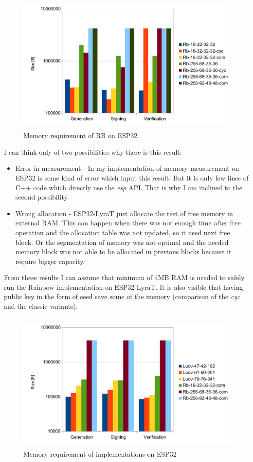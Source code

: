 \documentclass[thesis=M,english]{FITthesis}[2019/12/23]
\begin{document}
\begin{figure}[H]
\centering
\includegraphics[width=13cm,height=7cm]{images/mem-rb.pdf}
\caption{Memory requirement of RB on ESP32}
\label{mem-rb}
\end{figure}

\noindent
I can think only of two possibilities why there is this result:
\begin{itemize}
\item	Error in measurement - In my implementation of memory measurement on ESP32 is some kind of error which input this result. But it is only few lines of C++ code which directly use the \textit{esp} API. That is why I am inclined to the second possibility.
\item	Wrong allocation - ESP32-LyraT just allocate the rest of free memory in external RAM. This can happen when there was not enough time after free operation and the allocation table was not updated, so it used next free block. Or the segmentation of memory was not optimal and the needed memory block was not able to be allocated in previous blocks because it require bigger capacity.
\end{itemize}

\bigskip
\noindent
From these results I can assume that minimum of 4MB RAM is needed to safely run the Rainbow implementation on ESP32-LyraT. It is also visible that having public key in the form of seed save some of the memory (comparison of the \textit{cyc} and the classic variants).

\begin{figure}[H]
\centering
\includegraphics[width=13cm,height=7cm]{images/mem-both.pdf}
\caption{Memory requirement of implementations on ESP32}
\label{mem-both}
\end{figure}
\end{document}
